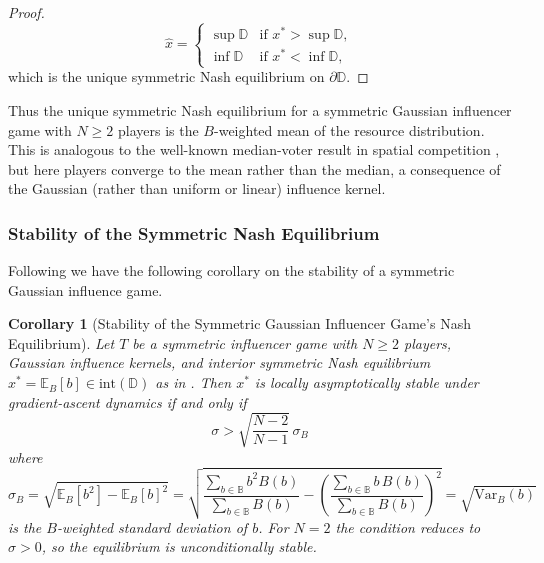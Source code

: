 \documentclass{article}
\newtheorem{corollary}{Corollary}[theorem]
\begin{document}
\begin{proof}
                \begin{equation}
                    \hat{x} = \begin{cases} \sup\mathbb{D} & \text{if } x^* > \sup\mathbb{D}, \\ 
                    \inf\mathbb{D} & \text{if } x^* < \inf\mathbb{D}, \end{cases}
                \end{equation}
                which is the unique symmetric Nash equilibrium on $\partial\mathbb{D}$.
            \end{proof}            
            Thus the unique symmetric Nash equilibrium for a symmetric Gaussian influencer game with $N \geq 2$ players is the $B$-weighted mean of the resource distribution. This is analogous to the well-known median-voter result in spatial competition \cite{hotelling1929stability}, but here players converge to the mean rather than the median, a consequence of the Gaussian (rather than uniform or linear) influence kernel. 
        
            \subsubsection{Stability of the Symmetric Nash Equilibrium}
            Following  we have the following corollary on the stability of a symmetric Gaussian influence game. 
            \begin{corollary}[Stability of the Symmetric Gaussian Influencer Game's 
            Nash Equilibrium]\label{cor:SI_Gaussian_stability}
                Let $T$ be a symmetric influencer game with $N\geq 2$ players, Gaussian influence kernels, and interior symmetric Nash equilibrium $x^* = \mathbb{E}_B[b] \in \mathrm{int}(\mathbb{D})$ as in . Then $x^*$ is locally asymptotically 
                stable under gradient-ascent dynamics if and only if
                \begin{equation}
                    \sigma > \sqrt{\frac{N-2}{N-1}}\,\sigma_B
                \end{equation}
                where
                \begin{equation}
                    \sigma_B = \sqrt{\mathbb{E}_B[b^2] - \mathbb{E}_B[b]^2} = 
                    \sqrt{\frac{\sum_{b\in\mathbb{B}} b^2 B(b)}{\sum_{b\in\mathbb{B}} B(b)} 
                    - \left(\frac{\sum_{b\in\mathbb{B}} b\, B(b)}
                    {\sum_{b\in\mathbb{B}} B(b)}\right)^2}
                    = \sqrt{\mathrm{Var}_B(b)}
                \end{equation}
                is the $B$-weighted standard deviation of $b$. For $N=2$ the condition reduces to $\sigma > 0$, so the equilibrium is unconditionally stable.
            \end{corollary}
\end{document}
